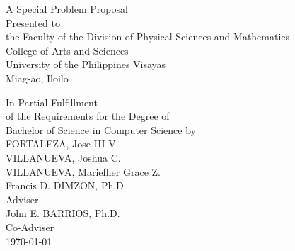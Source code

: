 \begin{titlepage}
    \centering
    
    
    \vspace{1cm}
    A Special Problem Proposal\\
    Presented to\\
    the Faculty of the Division of Physical Sciences and Mathematics\\
    College of Arts and Sciences\\
    University of the Philippines Visayas\\
    Miag-ao, Iloilo
    
    \vspace{1cm}
    In Partial Fulfillment\\
    of the Requirements for the Degree of\\
    Bachelor of Science in Computer Science
    \vspace{1cm}
    by\\
    
    \vspace{1cm}
    FORTALEZA, Jose III V. \\
    VILLANUEVA, Joshua C.  \\
    VILLANUEVA, Mariefher Grace Z.  \\
    
    \vspace{1cm}
    Francis D. DIMZON, Ph.D. \\
    Adviser\\
    
    \vspace{1cm}
    John E. BARRIOS, Ph.D. \\
    Co-Adviser\\
    
    \vspace{1.75cm}
    \today
    \end{titlepage}